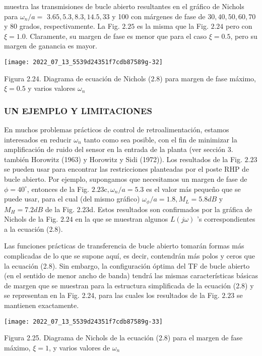 muestra las transmisiones de bucle abierto resultantes en el gráfico de Nichols para $\omega_{n} / a=$ $3.65,5.3,8.3,14.5,33$ y 100 con márgenes de fase de $30,40,50,60,70$ y 80 grados, respectivamente. La Fig. $2.25$ es la misma que la Fig. $2.24$ pero con $\xi=1.0$. Claramente, su margen de fase es menor que para el caso $\xi=0.5$, pero su margen de ganancia es mayor.

\texttt{[image: 2022\_07\_13\_5539d24351f7cdb87589g-32]}

Figura 2.24. Diagrama de ecuación de Nichols (2.8) para margen de fase máximo, $\xi=0.5$ y varios valores $\omega_{n}$

\subsubsection{UN EJEMPLO Y LIMITACIONES}
En muchos problemas prácticos de control de retroalimentación, estamos interesados en reducir $\omega_{n}$ tanto como sea posible, con el fin de minimizar la amplificación de ruido del sensor en la entrada de la planta (ver sección 3. también Horowitz (1963) y Horowitz y Sidi (1972)). Los resultados de la Fig. $2.23$ se pueden usar para encontrar las restricciones planteadas por el poste RHP de bucle abierto. Por ejemplo, supongamos que necesitamos un margen de fase de $\phi=40^{\circ}$, entonces de la Fig. $2.23 \mathrm{c}, \omega_{n} / a=5.3$ es el valor más pequeño que se puede usar, para el cual (del mismo gráfico) $\omega_{\phi} / a=1.8, M_{L}=5.8 d B$ y $M_{H}=7.2 d B$ de la Fig. 2.23d. Estos resultados son confirmados por la gráfica de Nichols de la Fig. $2.24$ en la que se muestran algunos $L(j \omega)$ 's correspondientes a la ecuación (2.8).

Las funciones prácticas de transferencia de bucle abierto tomarán formas más complicadas de lo que se supone aquí, es decir, contendrán más polos y ceros que la ecuación (2.8). Sin embargo, la configuración óptima del TF de bucle abierto (en el sentido de menor ancho de banda) tendrá las mismas características básicas de margen que se muestran para la estructura simplificada de la ecuación (2.8) y se representan en la Fig. 2.24, para las cuales los resultados de la Fig. $2.23$ se mantienen exactamente.

\texttt{[image: 2022\_07\_13\_5539d24351f7cdb87589g-33]}

Figura 2.25. Diagrama de Nichols de la ecuación (2.8) para el margen de fase máximo, $\xi=1$, y varios valores de $\omega_{n}$

